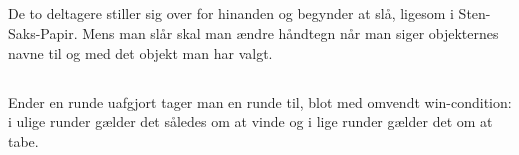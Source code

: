 \documentclass{article}
\begin{document}
\subsection{}
De to deltagere stiller sig over for hinanden og begynder at slå, ligesom i Sten-Saks-Papir. Mens man slår skal man ændre håndtegn når man siger objekternes navne til og med det objekt man har valgt.
\subsection{}
Ender en runde uafgjort tager man en runde til, blot med omvendt win-condition: i ulige runder gælder det således om at vinde og i lige runder gælder det om at tabe.


\vfill
\doclicenseThis
\end{document}
